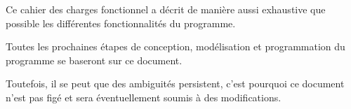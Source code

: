 Ce cahier des charges fonctionnel a décrit de manière aussi exhaustive que possible les différentes fonctionnalités du programme. 

Toutes les prochaines étapes de conception, modélisation et programmation du programme se baseront sur ce document. 

Toutefois, il se peut que des ambiguités persistent, c'est pourquoi ce document n'est pas figé et sera éventuellement soumis à des modifications.